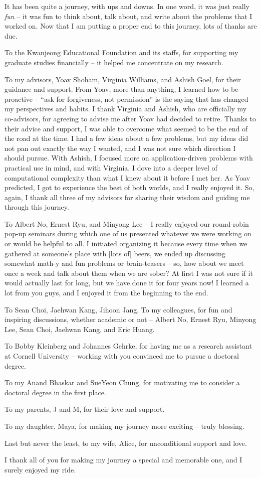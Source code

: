 It has been quite a journey, with ups and downs.
In one word, it was just really {\em fun} -- it was fun to think about, talk about, and write about the problems that I worked on. 
Now that I am putting a proper end to this journey, lots of thanks are due. 

To the Kwanjeong Educational Foundation and its staffs, for supporting my graduate studies financially -- it helped me concentrate on my research.

To my advisors, Yoav Shoham, Virginia Williams, and Ashish Goel, for their guidance and support. From Yoav, more than anything, I learned how to be proactive -- ``ask for forgiveness, not permission'' is the saying that has changed my perspectives and habits. I thank Virginia and Ashish, who are officially my co-advisors, for agreeing to advise me after Yoav had decided to retire. Thanks to their advice and support, I was able to overcome what seemed to be the end of the road at the time. I had a few ideas about a few problems, but my ideas did not pan out exactly the way I wanted, and I was not sure which direction I should pursue. With Ashish, I focused more on application-driven problems with practical use in mind, and with Virginia, I dove into a deeper level of computational complexity than what I knew about it before I met her. As Yoav predicted, I got to experience the best of both worlds, and I really enjoyed it. So, again, I thank all three of my advisors for sharing their wisdom and guiding me through this journey.

To Albert No, Ernest Ryu, and Minyong Lee -- I really enjoyed our round-robin pop-up seminars during which one of us presented whatever we were working on or would be helpful to all. I initiated organizing it because every time when we gathered at someone's place with [lots of] beers, we ended up discussing somewhat math-y and fun problems or brain-teasers -- so, how about we meet once a week and talk about them when we are sober? At first I was not sure if it would actually last for long, but we have done it for four years now! I learned a lot from you guys, and I enjoyed it from the beginning to the end. 

To Sean Choi, Jaehwan Kang, Jihoon Jang, 
To my colleagues, for fun and inspiring discussions, whether academic or not -- Albert No, Ernest Ryu, Minyong Lee, Sean Choi, Jaehwan Kang, and Eric Huang. 


To Bobby Kleinberg and Johannes Gehrke, for having me as a research assistant at Cornell University -- working with you convinced me to pursue a doctoral degree.

To my Anand Bhaskar and SueYeon Chung, for motivating me to consider a doctoral degree in the first place.

To my parents, J and M, for their love and support.

To my daughter, Maya, for making my journey more exciting -- truly blessing.

Last but never the least, to my wife, Alice, for unconditional support and love.

I thank all of you for making my journey a special and memorable one, and I surely enjoyed my ride.


